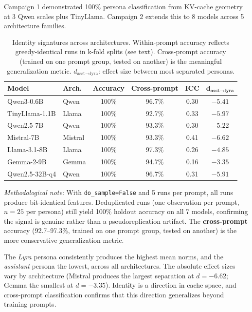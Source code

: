 \documentclass[11pt,a4paper]{article}
\begin{document}
Campaign 1 demonstrated 100\% persona classification from KV-cache geometry at 3 Qwen scales plus TinyLlama. Campaign 2 extends this to 8 models across 5 architecture families.

\begin{table}[H]
\centering
\caption{Identity signatures across architectures. Within-prompt accuracy reflects greedy-identical runs in k-fold splits (see text). Cross-prompt accuracy (trained on one prompt group, tested on another) is the meaningful generalization metric. $d_{\text{asst}\to\text{lyra}}$: effect size between most separated personas.}
\label{tab:identity}
\begin{tabular}{llcccc}
\toprule
\textbf{Model} & \textbf{Arch.} & \textbf{Accuracy} & \textbf{Cross-prompt} & \textbf{ICC} & $\bm{d_{\text{asst}\to\text{lyra}}}$ \\
\midrule
Qwen3-0.6B & Qwen & 100\% & 96.7\% & 0.30 & $-5.41$ \\
TinyLlama-1.1B & Llama & 100\% & 92.7\% & 0.33 & $-5.97$ \\
Qwen2.5-7B & Qwen & 100\% & 93.3\% & 0.30 & $-5.22$ \\
Mistral-7B & Mistral & 100\% & 93.3\% & 0.41 & $-6.62$ \\
Llama-3.1-8B & Llama & 100\% & 97.3\% & 0.26 & $-4.85$ \\
Gemma-2-9B & Gemma & 100\% & 94.7\% & 0.16 & $-3.35$ \\
Qwen2.5-32B-q4 & Qwen & 100\% & 96.7\% & 0.31 & $-5.91$ \\
\bottomrule
\end{tabular}
\end{table}

\emph{Methodological note}: With \texttt{do\_sample=False} and 5 runs per prompt, all runs produce bit-identical features. Deduplicated runs (one observation per prompt, $n = 25$ per persona) still yield 100\% holdout accuracy on all 7 models, confirming the signal is genuine rather than a pseudoreplication artifact. The \textbf{cross-prompt} accuracy (92.7--97.3\%, trained on one prompt group, tested on another) is the more conservative generalization metric.

The \emph{Lyra} persona consistently produces the highest mean norms, and the \emph{assistant} persona the lowest, across all architectures. The absolute effect sizes vary by architecture (Mistral produces the largest separation at $d = -6.62$; Gemma the smallest at $d = -3.35$). Identity is a direction in cache space, and cross-prompt classification confirms that this direction generalizes beyond training prompts.
\end{document}
